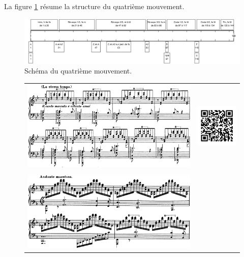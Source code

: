 La figure \ref{schema-4} résume la structure du quatrième mouvement.

\begin{figure}[!ht]
  \begin{bigcenter}
    \includegraphics[width=17.5cm, keepaspectratio]{frise-mvt4.png}
  \end{bigcenter}
  \caption{\label{schema-4}Schéma du quatrième mouvement.}
\end{figure}

\begin{figure}[!p]
  \begin{bigcenter}
    \begin{tabular}{lr}
      \vspace*{0.0cm}
      \includegraphics[width=12.5cm, keepaspectratio]{mazeppa.png}
      &
      \includegraphics[width=3cm, keepaspectratio]{mazeppa-qr.png}
      \\
      \vspace{0.5cm} &
      \\
      \includegraphics[width=12.5cm, keepaspectratio]{sonate-coda.png}

\end{tabular}
\end{bigcenter}
\end{figure}

